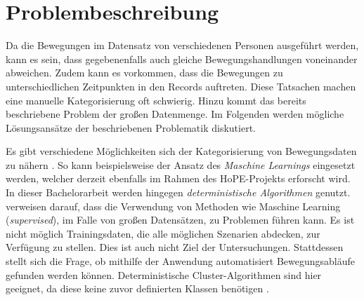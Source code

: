\clearpage
\section{Problembeschreibung}
\label{2-Problembeschreibung}
Da die Bewegungen im Datensatz von verschiedenen Personen ausgeführt werden,
kann es sein, dass gegebenenfalls auch gleiche Bewegungshandlungen voneinander abweichen.
Zudem kann es vorkommen, dass die Bewegungen zu unterschiedlichen Zeitpunkten in den Records auftreten.
Diese Tatsachen machen eine manuelle Kategorisierung oft schwierig.
Hinzu kommt das bereits beschriebene Problem der großen Datenmenge.
Im Folgenden werden mögliche Lösungsansätze der beschriebenen Problematik diskutiert.

Es gibt verschiedene Möglichkeiten sich der Kategorisierung von Bewegungsdaten zu nähern \citep{aghabozorgi_time-series_2015}.
So kann beispielsweise der Ansatz des \emph{Maschine Learnings} eingesetzt werden,
welcher derzeit ebenfalls im Rahmen des HoPE-Projekts erforscht \citep{plischke_master_2022} wird.
In dieser Bachelorarbeit werden hingegen \emph{deterministische Algorithmen} genutzt.
\citet{aghabozorgi_time-series_2015} verweisen darauf, dass die Verwendung von Methoden
wie Maschine Learning (\emph{supervised}), im Falle von großen Datensätzen, zu Problemen führen kann.
Es ist nicht möglich Trainingsdaten, die alle möglichen Szenarien abdecken, zur Verfügung zu stellen.
Dies ist auch nicht Ziel der Untersuchungen.
Stattdessen stellt sich die Frage,
ob mithilfe der Anwendung automatisiert Bewegungsabläufe gefunden werden können.
Deterministische Cluster-Algorithmen sind hier geeignet,
da diese keine zuvor definierten Klassen benötigen \citep{aghabozorgi_time-series_2015}.


